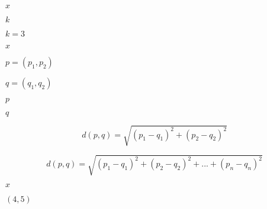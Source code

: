 \documentclass[10pt]{book}
\begin{document}
\begin{mdSnippets}
\begin{mdInlineSnippet}[9dd4e461268c8034f5c8564e155c67a6]%
$x$\end{mdInlineSnippet}%
\begin{mdInlineSnippet}[8ce4b16b22b58894aa86c421e8759df3]%
$k$\end{mdInlineSnippet}%
\begin{mdInlineSnippet}[d425c55d57cd55fcab081d411d30c5a4]%
$k = 3$\end{mdInlineSnippet}%
\begin{mdInlineSnippet}[9dd4e461268c8034f5c8564e155c67a6]%
$x$\end{mdInlineSnippet}%
\begin{mdInlineSnippet}[efbcdd110be134c6f49a7305ac17f4a6]%
$p = (p_1, p_2)$\end{mdInlineSnippet}%
\begin{mdInlineSnippet}[72d63d5b07b35f16409b11f10b332243]%
$q = (q_1, q_2)$\end{mdInlineSnippet}%
\begin{mdInlineSnippet}[83878c91171338902e0fe0fb97a8c47a]%
$p$\end{mdInlineSnippet}%
\begin{mdInlineSnippet}[7694f4a66316e53c8cdd9d9954bd611d]%
$q$\end{mdInlineSnippet}%
\begin{mdDisplaySnippet}%
\[%
d(p,q) = \sqrt{(p_1 - q_1)^2 + (p_2 - q_2)^2}
\]%
\end{mdDisplaySnippet}%
\begin{mdDisplaySnippet}[15d99a16555ce3719bf621bf24ee8234]%
\[%
d(p,q) = \sqrt{(p_1 - q_1)^2 + (p_2 - q_2)^2 + ... + (p_n - q_n)^2}
\]%
\end{mdDisplaySnippet}%
\begin{mdInlineSnippet}[9dd4e461268c8034f5c8564e155c67a6]%
$x$\end{mdInlineSnippet}%
\begin{mdInlineSnippet}[f8ef020e454c944f551146b7c1bd24d3]%
$(4, 5)$\end{mdInlineSnippet}%

\end{mdSnippets}
\end{document}
